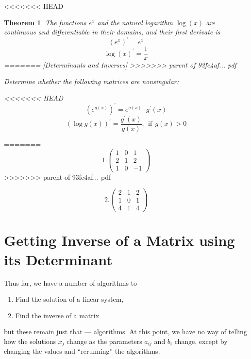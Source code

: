 \documentclass[]{book}
\providecommand{\tightlist}{%
  \setlength{\itemsep}{0pt}\setlength{\parskip}{0pt}}
\newtheorem{theorem}{Theorem}[chapter]
\theoremstyle{definition}
\theoremstyle{definition}
\theoremstyle{definition}
\theoremstyle{remark}
\begin{document}
<<<<<<< HEAD
\begin{theorem}
\protect\hypertarget{thm:derivexplog}{}{\label{thm:derivexplog} }
The functions \(e^x\) and the natural logarithm \(\log(x)\) are continuous and differentiable in their domains, and their first derivate is
\[(e^x)^\prime = e^x\]
\[\log(x)^\prime = \frac{1}{x}\]
=======
[Determinants and Inverses]
\protect\hypertarget{exr:determinants}{}{\label{exr:determinants} {} }
>>>>>>> parent of 93fc4af... pdf

Determine whether the following matrices are nonsingular:

<<<<<<< HEAD
\[\left(e^{g(x)}\right)^\prime = e^{g(x)} \cdot g^\prime(x)\]
\[\left(\log g(x)\right)^\prime = \frac{g^\prime(x)}{g(x)}, ~~\text{if}~~ g(x) > 0\]
\end{theorem}
=======
\[1. \begin{pmatrix}
            1 & 0 & 1\\
            2 & 1 & 2\\
            1 & 0 & -1
        \end{pmatrix}\]
>>>>>>> parent of 93fc4af... pdf

\[2. \begin{pmatrix}
            2 & 1 & 2\\
            1 & 0 & 1\\
            4 & 1 & 4
        \end{pmatrix}\]

\hypertarget{getting-inverse-of-a-matrix-using-its-determinant}{%
\section{Getting Inverse of a Matrix using its Determinant}\label{getting-inverse-of-a-matrix-using-its-determinant}}

Thus far, we have a number of algorithms to

\begin{enumerate}
\def\labelenumi{\arabic{enumi}.}
\tightlist
\item
  Find the solution of a linear system,
\item
  Find the inverse of a matrix
\end{enumerate}

but these remain just that --- algorithms. At this point, we have no way of telling how the solutions \(x_j\) change as the parameters \(a_{ij}\) and \(b_i\) change, except by changing the values and ``rerunning'' the algorithms.
\end{document}
